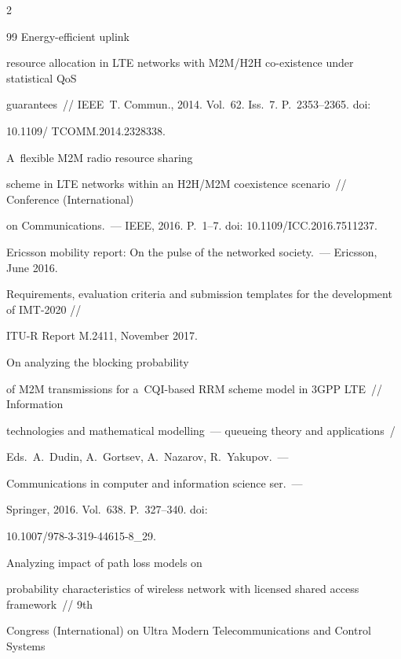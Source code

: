 \begin{multicols}{2}
{{\begin{thebibliography}{99}
 Energy-efficient uplink 


resource allocation in LTE networks with M2M/H2H co-existence under statistical QoS 


guarantees~// IEEE~T. Commun., 2014. Vol.~62. Iss.~7. P.~2353--2365. doi: 


10.1109/ TCOMM.2014.2328338.




 A~flexible M2M radio resource sharing 


scheme in LTE networks within an H2H/M2M coexistence scenario~// Conference (International) 


on Communications.~--- IEEE, 2016. P.~1--7. doi: 10.1109/ICC.2016.7511237.




Ericsson mobility report: On the pulse of the networked society.~--- Ericsson, June 2016.




Requirements, evaluation criteria and submission templates for the development of IMT-2020 // 


ITU-R Report M.2411, November 2017.




 On analyzing the blocking probability 


of M2M transmissions for a~CQI-based RRM scheme model in 3GPP LTE~// Information 


technologies and mathematical modelling~--- queueing theory and applications~/


Eds.\ A.~Dudin, A.~Gortsev, A.~Nazarov, R.~Yakupov.~---


Communications in computer and information science ser.~---


Springer, 2016. Vol.~638. P.~327--340. doi: 


10.1007/978-3-319-44615-8\_29.




 Analyzing impact of path loss models on 


probability characteristics of wireless network with licensed shared access framework~//  9th 


Congress (International) on Ultra Modern Telecommunications and Control Systems  



\end{thebibliography}}}
\end{multicols}
